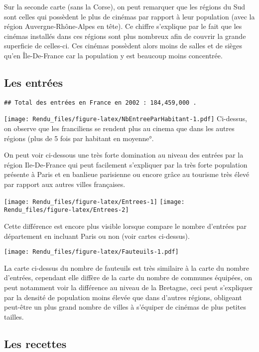 \documentclass[
]{article}
\begin{document}
Sur la seconde carte (sans la Corse), on peut remarquer que les régions
du Sud sont celles qui possèdent le plus de cinémas par rapport à leur
population (avec la région Auvergne-Rhône-Alpes en tête). Ce chiffre
s'explique par le fait que les cinémas installés dans ces régions sont
plus nombreux afin de couvrir la grande superficie de celles-ci. Ces
cinémas possèdent alors moins de salles et de sièges qu'en Île-De-France
car la population y est beaucoup moins concentrée.

\hypertarget{les-entruxe9es}{%
\subsection{Les entrées}\label{les-entruxe9es}}

\begin{verbatim}
## Total des entrées en France en 2002 : 184,459,000 .
\end{verbatim}

\texttt{[image: Rendu\_files/figure-latex/NbEntreeParHabitant-1.pdf]}
Ci-dessus, on observe que les franciliens se rendent plus au cinema que
dans les autres régions (plus de 5 fois par habitant en moyenne°.

On peut voir ci-dessous une très forte domination au niveau des entrées
par la région Ile-De-France qui peut facilement s'expliquer par la très
forte population présente à Paris et en banlieue parisienne ou encore
grâce au tourisme très élevé par rapport aux autres villes françaises.

\texttt{[image: Rendu\_files/figure-latex/Entrees-1]}
\texttt{[image: Rendu\_files/figure-latex/Entrees-2]}

Cette différence est encore plus visible lorsque compare le nombre
d'entrées par département en incluant Paris ou non (voir cartes
ci-dessus).

\texttt{[image: Rendu\_files/figure-latex/Fauteuils-1.pdf]}

La carte ci-dessus du nombre de fauteuils est très similaire à la carte
du nombre d'entrées, cependant elle diffère de la carte du nombre de
communes équipées, on peut notamment voir la différence au niveau de la
Bretagne, ceci peut s'expliquer par la densité de population moins
élevée que dans d'autres régions, obligeant peut-être un plus grand
nombre de villes à s'équiper de cinémas de plus petites tailles.

\hypertarget{les-recettes}{%
\subsection{Les recettes}\label{les-recettes}}
\end{document}
